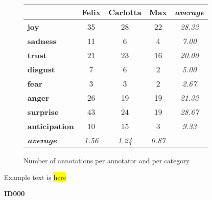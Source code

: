 \documentclass[a4,12pt]{scrartcl}
\begin{document}
\begin{figure}
\centering
\begin{tabular}{l|cccc}
& \textbf{Felix} & \textbf{Carlotta} & \textbf{Max} & \textbf{\textit{average}}\\\hline
\textbf{joy} & 35 & 28 & 22 & \textit{28.33}\\
\textbf{sadness} & 11 & 6 & 4 & \textit{7.00}\\
\textbf{trust} & 21 & 23 & 16 & \textit{20.00}\\
\textbf{disgust} & 7 & 6 & 2 & \textit{5.00}\\
\textbf{fear} & 3 & 3 & 2 & \textit{2.67}\\
\textbf{anger} & 26 & 19 & 19 & \textit{21.33} \\
\textbf{surprise} & 43 & 24 & 19 & \textit{28.67} \\
\textbf{anticipation} & 10 & 15 & 3 & \textit{9.33} \\
\textbf{\textit{average}} & \textit{1.56} & \textit{1.24} & \textit{0.87} \\
\end{tabular}
\caption{Number of annotations per annotator and per category}
\end{figure}

\begin{center} %
\begin{tcolorbox}[width=40mm] %
\begin{itshape}
Example text is \colorbox{yellow}{here} %
\end{itshape}
\flushright \textbf{ID000} %
\end{tcolorbox}
\end{center}
\end{document}
